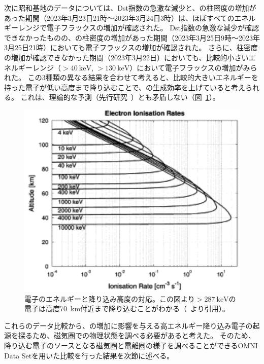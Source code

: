 次に昭和基地のデータについては、Dst指数の急激な減少と、の柱密度の増加があった期間（2023年3月23日21時〜2023年3月24日3時）は、ほぼすべてのエネルギーレンジで電子フラックスの増加が確認された。
Dst指数の急激な減少が確認できなかったものの、の柱密度の増加があった期間（2023年3月25日9時〜2023年3月25日21時）においても電子フラックスの増加が確認された。
さらに、柱密度の増加が確認できなかった期間（2023年3月22日）においても、比較的小さいエネルギーレンジ（$>40\ \mathrm{keV}$, $>130\ \mathrm{keV}$）において電子フラックスの増加がみられた。
この3種類の異なる結果を合わせて考えると、比較的大きいエネルギーを持った電子が低い高度まで降り込むことで、の生成効率を上げていると考えられる。
これは、理論的な予測（先行研究~\cite{turunen2009impact}）とも矛盾しない（図~\ref{fig:turunen2009impact_fig3r}）。
\begin{figure}[htbp]
    \centering
    \includegraphics{master_thesis_contents/master_thesis_fig/turunen2009impact_fig3r.pdf}
    \caption{電子のエネルギーと降り込み高度の対応。この図より$>287\ \mathrm{keV}$の電子は高度70\ km付近まで降り込むことがわかる（~\cite{turunen2009impact}より引用）。}
    \label{fig:turunen2009impact_fig3r}
\end{figure} \par

これらのデータ比較から、の増加に影響を与える高エネルギー降り込み電子の起源を探るため、磁気圏での物理状態を調べる必要があると考えた。
そのため、降り込む電子のソースとなる磁気圏と電離圏の様子を調べることができるOMNI Data Setを用いた比較を行った結果を次節に述べる。


